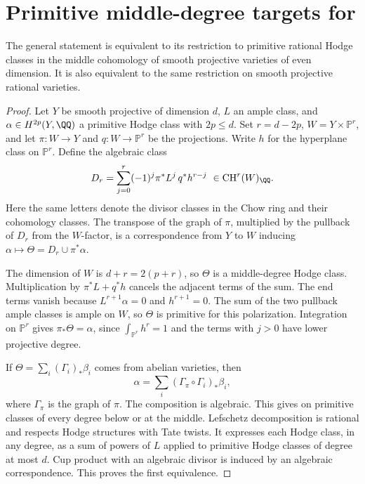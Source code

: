 \section{Primitive middle-degree targets for \texorpdfstring{\Fiii{}}{(F3')}}
\label{v7:sec:primitive-middle}

\begin{theorem}
\label{v7:thm:primitive-middle}
The general statement \Fiii{} is equivalent to its restriction to
primitive rational Hodge classes in the middle cohomology of smooth
projective varieties of even dimension. It is also equivalent to the
same restriction on smooth projective rational varieties.
\end{theorem}

\begin{proof}
Let \(Y\) be smooth projective of dimension \(d\), \(L\) an ample class,
and \(\alpha\in H^{2p}(Y,\QQ)\) a primitive Hodge class with \(2p\le d\).
Set \(r=d-2p\), \(W=Y\times\mathbb P^r\), and let
\(\pi\colon W\to Y\) and \(q\colon W\to\mathbb P^r\) be the projections.
Write \(h\) for the hyperplane class on \(\mathbb P^r\). Define the
algebraic class
\[
 D_r=\sum_{j=0}^{r}(-1)^j\pi^*L^j\,q^*h^{r-j}\ \in\operatorname{CH}^r(W)_{\QQ}.
\]
Here the same letters denote the divisor classes in the Chow ring and
their cohomology classes. The transpose of the graph of \(\pi\),
multiplied by the pullback of \(D_r\) from the \(W\)-factor, is a
correspondence from \(Y\) to \(W\) inducing
\(\alpha\mapsto\Theta=D_r\cup\pi^*\alpha\).

The dimension of \(W\) is \(d+r=2(p+r)\), so \(\Theta\) is a
middle-degree Hodge class. Multiplication by \(\pi^*L+q^*h\) cancels
the adjacent terms of the sum. The end terms vanish because
\(L^{r+1}\alpha=0\) and \(h^{r+1}=0\). The sum of the two pullback
ample classes is ample on \(W\), so \(\Theta\) is primitive for this
polarization. Integration on \(\mathbb P^r\) gives
\(\pi_*\Theta=\alpha\), since \(\int_{\mathbb P^r} h^r=1\) and the
terms with \(j>0\) have lower projective degree.

If \(\Theta=\sum_i(\Gamma_i)_*\beta_i\) comes from abelian varieties,
then
\[
 \alpha=\sum_i(\Gamma_\pi\circ\Gamma_i)_*\beta_i,
\]
where \(\Gamma_\pi\) is the graph of \(\pi\).
The composition is algebraic. This gives \Fiii{} on primitive classes
of every degree below or at the middle. Lefschetz decomposition is
rational and respects Hodge structures with Tate twists. It expresses
each Hodge class, in any degree, as a sum of powers of \(L\) applied
to primitive Hodge classes of degree at most \(d\). Cup product with
an algebraic divisor is induced by an algebraic correspondence.
This proves the first equivalence.


\end{proof}
